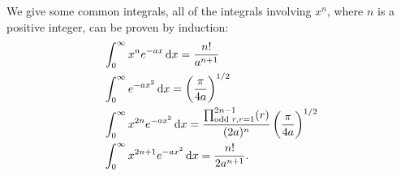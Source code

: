 \begin{prt}
\label{integrals}
We give some common integrals, all of the integrals involving $x^n$, where $n$ is a positive integer, can be proven by induction:
\begin{subequations}
\begin{align}
&\int^{\inf}_0 x^ne^{-ax}\dx=\frac{n!}{a^{n+1}} \label{integral1}\\
&\int^{\inf}_0 e^{-ax^2}\dx=\lf(\frac{\pi}{4a} \rt)^{1/2}\\
&\int^{\inf}_0 x^{2n}e^{-ax^2}\dx=\frac{\prod_{\text{odd }r,r=1}^{2n-1}(r)}{(2a)^{n}}\lf(\frac{\pi}{4a} \rt)^{1/2}\\
&\int^{\inf}_0 x^{2n+1}e^{-ax^2}\dx=\frac{n!}{2a^{n+1}}.
\end{align}
\end{subequations}
\end{prt}
